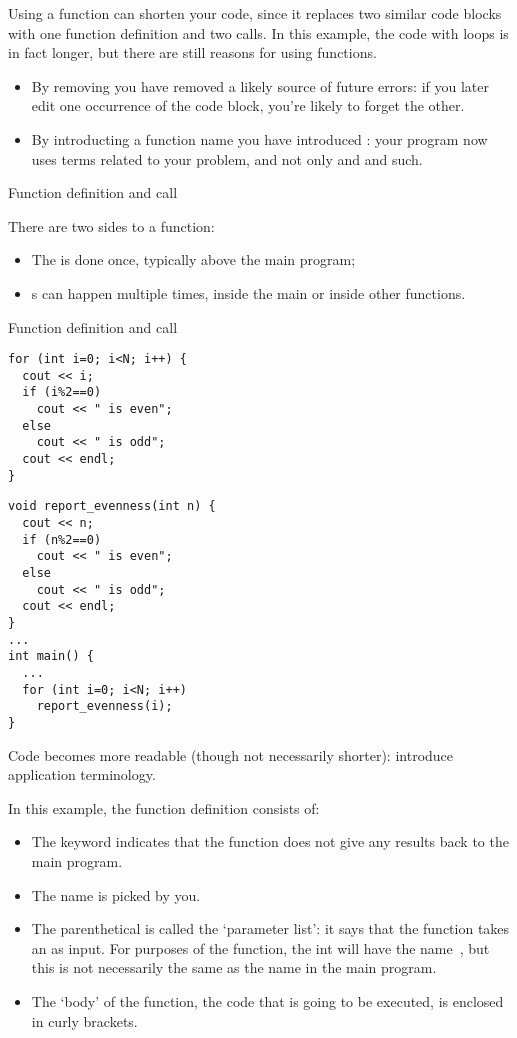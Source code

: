 Using a function can shorten your code, since it replaces two similar
code blocks with one function definition and two calls.
In this example, the code with loops is in fact longer, but there are
still reasons for using functions.
\begin{itemize}
\item By removing  you have removed a
  likely source of future errors: if you later edit one occurrence of
  the code block, you're likely to forget the other.
\item By introducting a function name you have introduced
  : your program now uses terms related to your
  problem, and not only  and  and such.
\end{itemize}

 {Function definition and call}

There are two sides to a function:
\begin{itemize}
\item
  The  is done once, typically
  above the main program;
\item {}s can happen multiple times, inside
  the main or inside other functions.
\end{itemize}

\begin{block}{Function definition and call}
  \label{sl:def-call}
  \begin{multicols}{2}
\begin{lstlisting}
for (int i=0; i<N; i++) {
  cout << i;
  if (i%2==0)
    cout << " is even";
  else
    cout << " is odd";
  cout << endl;
}
\end{lstlisting}
\columnbreak
\begin{lstlisting}
void report_evenness(int n) {
  cout << n;
  if (n%2==0)
    cout << " is even";
  else
    cout << " is odd";
  cout << endl;
}
...
int main() {
  ...
  for (int i=0; i<N; i++)
    report_evenness(i);
}
\end{lstlisting}
  \end{multicols}
Code becomes more readable (though not necessarily shorter): introduce
application terminology.
\end{block}

In this example, the function definition consists of:
\begin{itemize}
\item The keyword  indicates that the function does
  not give any results back to the main program.
\item The name  is picked by you.
\item The parenthetical  is called the `parameter list': it
  says that the function takes an  as input. For purposes of
  the function, the int will have the name~, but this is not
  necessarily the same as the name in the main program.
\item The `body' of the function, the code that is going to be
  executed, is enclosed in curly brackets.
\end{itemize}

